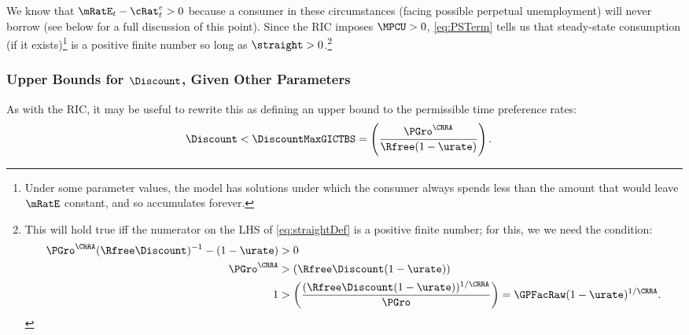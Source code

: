 \documentclass{\handout}
\begin{document}
We know that $\mRatE_{t}-{\cRat}^{e}_{t} > 0$ because a consumer in these circumstances (facing possible perpetual unemployment) will never borrow (see below for a full discussion of this point).  Since the RIC imposes $\MPCU>0$, \eqref{eq:PSTerm} tells us that steady-state consumption (if it exists)\footnote{Under some parameter values, the model has solutions under which the consumer always spends less than the amount that would leave $\mRatE$ constant, and so accumulates forever.} is a positive finite number so long as $\straight > 0$.\footnote{This will hold true iff the numerator on the LHS of \eqref{eq:straightDef} is a positive finite number; for this, we we need the condition:
\begin{equation}\begin{gathered}\begin{aligned}
        \PGro^{\CRRA}(\Rfree\Discount)^{-1}-(1-\urate) & >  0  \\
       \PGro^{\CRRA} & >  (\Rfree \Discount (1-\urate))
\\     1 & >  \left(\frac{(\Rfree \Discount (1-\urate))^{1/\CRRA}}{\PGro}\right) = \GPFacRaw (1-\urate)^{1/\CRRA} 
  \label{eq:GICExistsSoln} %
.\end{aligned}\end{gathered}\end{equation}
}

\hypertarget{GIFMax}{}\hypertarget{DiscountMaxGICTBS}{}

\subsubsection{Upper Bounds for $\Discount$, Given Other Parameters}


As with the RIC, it may be useful to rewrite this as defining an upper bound to the permissible time preference rates: 
\begin{equation}\begin{gathered}\begin{aligned}
\Discount < \DiscountMaxGICTBS & =  \left(\frac{\PGro^{\CRRA}}{\Rfree(1-\urate)}\right) \label{eq:DiscountMaxGICTBS}
.
\end{aligned}\end{gathered}\end{equation}
\end{document}
